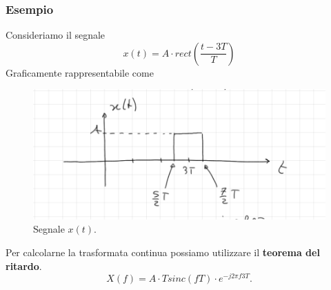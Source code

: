 \documentclass[12pt,oneside,openany]{memoir}
\numberwithin{equation}{subsection}
\begin{document}
\subsubsection{Esempio}
Consideriamo il segnale
\[
	x(t) = A \cdot rect\left(\frac{t - 3T}{T}\right)
\]
Graficamente rappresentabile come
\begin{figure}[H]
	\centering
	\captionsetup{justification=centering}
	\includegraphics[width=1.0\textwidth]{images/esempio_14_03_2018_2.png}
	\caption{Segnale $x(t)$.}
\end{figure}
Per calcolarne la trasformata continua possiamo utilizzare il \textbf{teorema
del ritardo}.
\[
	X(f) = A \cdot T sinc(f T) \cdot e^{-j 2 \pi f 3T}.
\]


\newpage
\end{document}
